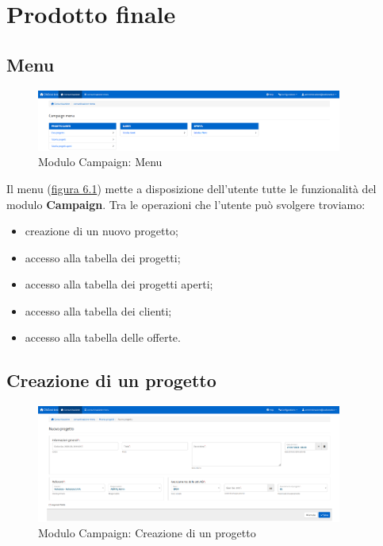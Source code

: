 \chapter{Prodotto finale}
\label{cap:prodotto-finale}


\setlength{\parskip}{3ex}

\section{Menu}
\begin{figure}[!h]
\centering
\includegraphics[width=380px]{../images/UI/01-menu.png}
\caption{Modulo Campaign: Menu}
\label{fig:menu}
\end{figure}

\noindent Il menu ({\hyperref[fig:menu]{figura 6.1}}) mette a disposizione dell'utente tutte le funzionalità del modulo \textbf{Campaign}. Tra le operazioni che l'utente può svolgere troviamo:
\begin{itemize}
\item creazione di un nuovo progetto;
\item accesso alla tabella dei progetti;
\item accesso alla tabella dei progetti aperti;
\item accesso alla tabella dei clienti;
\item accesso alla tabella delle offerte.
\end{itemize}

\pagebreak

\section{Creazione di un progetto}
\begin{figure}[!h]
\centering
\includegraphics[width=380px]{../images/UI/02-nuovoProgetto.png}
\caption{Modulo Campaign: Creazione di un progetto}
\label{fig:nuovoProgetto}
\end{figure}

